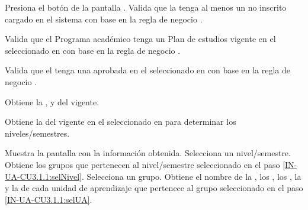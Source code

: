 \begin{UCtrayectoria}	
    \UCpaso[\UCactor] \label{IN-UA-CU3.1.1:solocitarInscribir}Presiona el botón  de la pantalla .
    \UCpaso Valida que la  tenga al menos un  no inscrito cargado en el sistema con base en la regla de negocio .
    
    \UCpaso Valida que el Programa académico tenga un Plan de estudios  vigente en el  seleccionado en  con base en la regla de negocio .
    
    \UCpaso Valida que el  tenga una  aprobada en el  seleccionado en  con base en la regla de negocio .
    
    \UCpaso Obtiene la ,  y  del  vigente.

    \UCpaso Obtiene la  del  vigente en el  seleccionado en  para determinar los niveles/semestres.
    
    \UCpaso Muestra la pantalla  con la información obtenida.
    \UCpaso[\UCactor]  \label{IN-UA-CU3.1.1:selNivel}Selecciona un nivel/semestre.
    \UCpaso Obtiene los grupos que pertenecen al nivel/semestre seleccionado en el paso \ref{IN-UA-CU3.1.1:selNivel}.
    \UCpaso[\UCactor]  \label{IN-UA-CU3.1.1:selGrupo}Selecciona un grupo.
    \UCpaso \label{IN-UA-CU3.1.1:obtenerUA}Obtiene el nombre de la , los , los , la  y la  de cada unidad de aprendizaje que pertenece al grupo seleccionado en el paso \ref{IN-UA-CU3.1.1:selUA}.
    

\end{UCtrayectoria}
